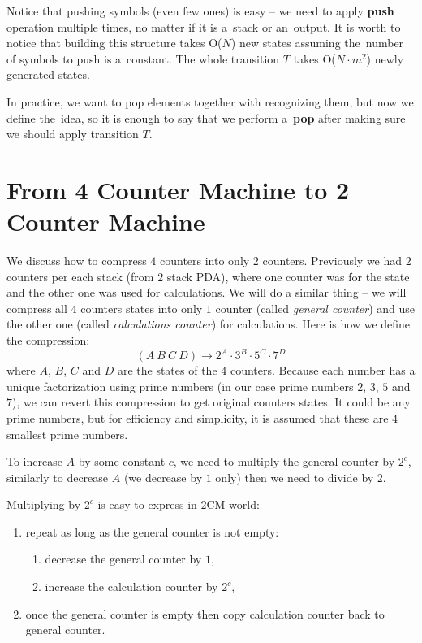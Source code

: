 \documentclass[english,shortabstract,mgr]{iithesis}
\begin{document}
Notice that pushing symbols (even few ones) is easy -- we need to apply \textbf{push} operation
multiple times, no matter if it is a~stack or an~output. It is worth to notice
that building this structure takes O($N$) new states assuming the~number of symbols
to push is a~constant. The whole transition $T$ takes O($N \cdot m^2$) newly
generated states.

In practice, we want to pop elements together with recognizing them, but now we define the~idea, so
it is enough to say that we perform a~\textbf{pop} after making sure we should apply transition $T$.

\section {From 4 Counter Machine to 2 Counter Machine}

We discuss how to compress $4$ counters into only $2$ counters. Previously we had
$2$ counters per each stack (from $2$ stack PDA), where one counter was
for the state and the other one was used for calculations. We will do a similar
thing -- we will compress all $4$ counters states into only $1$ counter
(called \textit{general counter}) and use the other one
(called \textit{calculations counter}) for calculations. Here is how we define
the compression:
$$ (A\ B\ C\ D) \rightarrow 2^A \cdot 3^B \cdot 5^C \cdot 7^D$$
where $A$, $B$, $C$ and $D$ are the states of the $4$ counters. Because each
number has a unique factorization using prime numbers (in our case
prime numbers $2$, $3$, $5$ and $7$), we can revert this compression
to get original counters states. It could be any prime numbers,
but for efficiency and simplicity, it is assumed that these are $4$ smallest
prime numbers.

To increase $A$ by some constant $c$, we need
to multiply the general counter by $2^c$, similarly to decrease $A$
(we decrease by $1$ only) then we need to divide by $2$.

Multiplying by $2^c$ is easy to express in $2$CM world:
\begin{enumerate}
  \item repeat as long as the general counter is not empty:
  \begin{enumerate}
    \item decrease the general counter by $1$,
    \item increase the calculation counter by $2^c$,
  \end{enumerate}
  \item once the general counter is empty then copy calculation counter back to general counter.
\end{enumerate}
\end{document}
